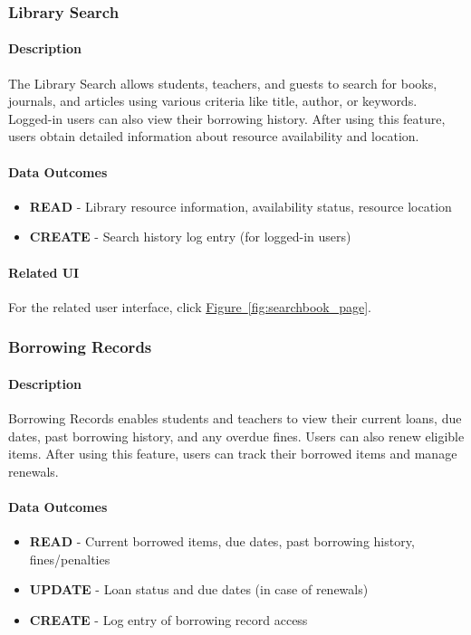 \documentclass[12pt]{article}
\begin{document}
\subsubsection{Library Search}

\paragraph{Description}
The Library Search allows students, teachers, and guests to search for books, journals, and articles using various criteria like title, author, or keywords. Logged-in users can also view their borrowing history. After using this feature, users obtain detailed information about resource availability and location.

\paragraph{Data Outcomes}
\begin{itemize}
    \item \textbf{READ} - Library resource information, availability status, resource location
    \item \textbf{CREATE} - Search history log entry (for logged-in users)
\end{itemize}

\paragraph{Related UI}
For the related user interface, click \hyperref[fig:searchbook_page]{Figure~\ref*{fig:searchbook_page}}.

\subsubsection{Borrowing Records}

\paragraph{Description}
Borrowing Records enables students and teachers to view their current loans, due dates, past borrowing history, and any overdue fines. Users can also renew eligible items. After using this feature, users can track their borrowed items and manage renewals.

\paragraph{Data Outcomes}
\begin{itemize}
    \item \textbf{READ} - Current borrowed items, due dates, past borrowing history, fines/penalties
    \item \textbf{UPDATE} - Loan status and due dates (in case of renewals)
    \item \textbf{CREATE} - Log entry of borrowing record access
\end{itemize}
\end{document}
